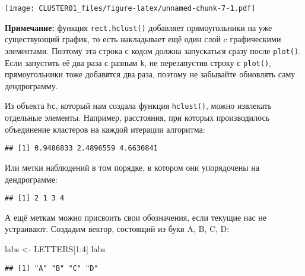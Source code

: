 \documentclass[
]{article}
\newenvironment{Shaded}{\begin{snugshade}}{\end{snugshade}}
\newcommand{\DecValTok}[1]{\textcolor[rgb]{0.00,0.00,0.81}{#1}}
\newcommand{\NormalTok}[1]{#1}
\newcommand{\OtherTok}[1]{\textcolor[rgb]{0.56,0.35,0.01}{#1}}
\newcommand{\SpecialCharTok}[1]{\textcolor[rgb]{0.00,0.00,0.00}{#1}}
\begin{document}
\texttt{[image: CLUSTER01\_files/figure-latex/unnamed-chunk-7-1.pdf]}

\textbf{Примечание:} функция \texttt{rect.hclust()} добавляет
прямоугольники на уже существующий график, то есть накладывает ещё один
слой c графическими элементами. Поэтому эта строка с кодом должна
запускаться сразу после \texttt{plot()}. Если запустить её два раза с
разным \texttt{k}, не перезапустив строку с \texttt{plot()},
прямоугольники тоже добавятся два раза, поэтому не забывайте обновлять
саму дендрограмму.

Из объекта \texttt{hc}, который нам создала функция \texttt{hclust()},
можно извлекать отдельные элементы. Например, расстояния, при которых
производилось объединение кластеров на каждой итерации алгоритма:

\begin{Shaded}
\end{Shaded}

\begin{verbatim}
## [1] 0.9486833 2.4896559 4.6630841
\end{verbatim}

Или метки наблюдений в том порядке, в котором они упорядочены на
дендрограмме:

\begin{Shaded}
\end{Shaded}

\begin{verbatim}
## [1] 2 1 3 4
\end{verbatim}

А ещё меткам можно присвоить свои обозначения, если текущие нас не
устраивают. Создадим вектор, состоящий из букв A, B, C, D:

\begin{Shaded}
\begin{Highlighting}[]
\NormalTok{labs }\OtherTok{\textless{}{-}}\NormalTok{ LETTERS[}\DecValTok{1}\SpecialCharTok{:}\DecValTok{4}\NormalTok{]}
\NormalTok{labs}
\end{Highlighting}
\end{Shaded}

\begin{verbatim}
## [1] "A" "B" "C" "D"
\end{verbatim}
\end{document}
